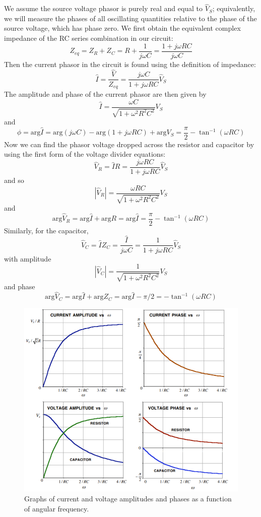 We assume the source voltage phasor is purely real and equal to $\hat{V}_S$; equivalently, we will measure the phases of all oscillating quantities relative to the phase of the source voltage, which has phase zero. We first obtain the equivalent complex impedance of the RC series combination in our circuit: $$Z_{eq} = Z_R + Z_C = R + \frac{1}{j\omega C} = \frac{1+j\omega RC}{j\omega C}$$ 
Then the current phasor in the circuit is found using the definition of impedance: $$\hat{I} = \frac{\hat{V}}{Z_{eq}} = \frac{j\omega C}{1+j\omega RC}\hat{V}_S$$
The amplitude and phase of the current phasor are then given by \begin{equation*}
    \hat{I} = \frac{\omega C}{\sqrt{1+\omega^2R^2C^2}}V_S
\end{equation*}
and \begin{equation*}
    \phi = \text{arg}\hat{I} = \text{arg}(j\omega C) - \text{arg}(1+j\omega RC) + \text{arg}V_S = \frac{\pi}{2} - \tan^{-1}(\omega RC)
\end{equation*}
Now we can find the phasor voltage dropped across the resistor and capacitor by using the first form of the voltage divider equations: $$\hat{V}_R = \hat{I}R = \frac{j\omega RC}{1+j\omega RC}\hat{V}_S$$
and so $$|\hat{V}_R| = \frac{\omega RC}{\sqrt{1+\omega^2R^2C^2}}V_S$$
and $$\text{arg}\hat{V}_R = \text{arg}\hat{I}+\text{arg}R = \text{arg}\hat{I} = \frac{\pi}{2} - \tan^{-1}(\omega RC)$$
Similarly, for the capacitor, $$\hat{V}_C = \hat{I}Z_C = \frac{\hat{I}}{j\omega C} = \frac{1}{1+j\omega RC}\hat{V}_S$$ with amplitude $$|\hat{V}_C| = \frac{1}{\sqrt{1+\omega^2R^2C^2}}V_S$$
and phase $$\text{arg}\hat{V}_C = \text{arg}\hat{I} + \text{arg}Z_C = \text{arg}\hat{I} - \pi/2 = - \tan^{-1}(\omega RC)$$

\begin{figure}[H]
    \centering
    \includegraphics[scale = 0.8]{Images/RCGraph.PNG}
    \caption{Graphs of current and voltage amplitudes and phases as a function of angular frequency.}
    \label{fig:RCGraph}
\end{figure}

